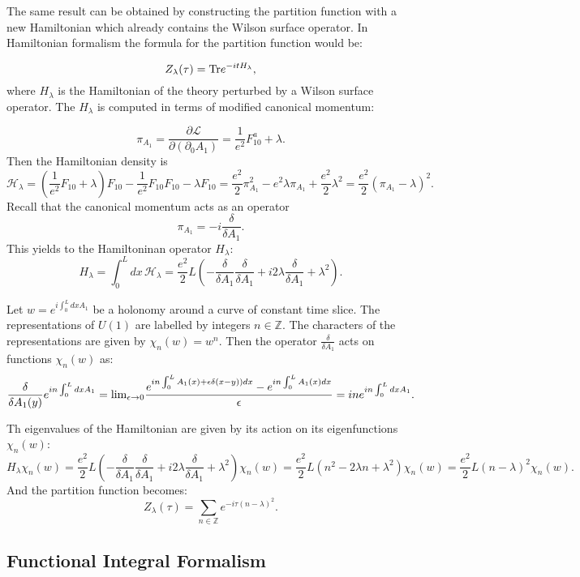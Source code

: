 \documentclass[11pt]{report}
\theoremstyle{plain}
\theoremstyle{definition}
\theoremstyle{remark}
\theoremstyle{remark}
\numberwithin{equation}{section}
\begin{document}
The same result can be obtained by constructing the partition function with a new Hamiltonian which already contains the Wilson surface operator. 
In Hamiltonian formalism the formula for the partition function would be:

 $$ 
Z_{\lambda}(\tau) = {\rm Tr} e^{-itH_{\lambda}},
$$
where $H_{\lambda}$ is the Hamiltonian of the theory perturbed by a Wilson surface operator. 
The $H_{\lambda}$ is computed in terms of modified canonical momentum:

$$
\pi_{A_1} = \frac{\partial \mathcal{L}}{\partial (\partial_0 A_1)} = \frac{1}{e^2}F^a_{10} + \lambda . 
$$
Then the Hamiltonian density is
%
$$
\mathcal{H_{\lambda}} = (\frac{1}{e^2}F_{10} + \lambda)F_{10} - \frac{1}{e^2}F_{10}F_{10} - \lambda F_{10} = \frac{e^2}{2}\pi_{A_1}^2 - e^2 \lambda \pi_{A_1} + \frac{e^2}{2} \lambda^2  = \frac{e^2}{2}(\pi_{A_1} - \lambda)^2.
$$
Recall that the canonical momentum acts as an operator 
%
$$
\pi_{A_1} = -i\frac{\delta}{\delta A_1}.
$$
This yields to the Hamiltoninan operator $H_{\lambda}$:
%
$$ H_{\lambda} = \int_0^L dx \, \mathcal{H_{\lambda}} = \frac{e^2}{2}L ( -\frac{\delta}{\delta A_1}\frac{\delta}{\delta A_1} +i 2\lambda \frac{\delta}{\delta A_1} + \lambda ^2).
$$

Let $w = e^{i\int_0^L dx A_1}$ be a holonomy around a curve of constant time slice. The representations of $U(1)$ are labelled by integers $n \in \mathbb{Z}$. The characters of the representations are given by $\chi_n(w) = w^n$. Then the operator $\frac{\delta}{\delta A_1}$ acts on functions $\chi_n(w)$ as:
%
$$
\frac{\delta}{\delta A_1(y)}e^{in\int_0^L dx A_1} = {\rm lim}_{\epsilon \to 0}\frac{ e^{in\int_0^L A_1(x) + \epsilon \delta(x-y))dx} -  e^{in\int_0^L A_1(x)dx}}{\epsilon}=in e^{in\int_0^L dx A_1}.
$$

Th eigenvalues of the Hamiltonian are given by its action on its eigenfunctions $\chi_n(w)$:
%
$$
H_{\lambda} \chi_n(w) = \frac{e^2}{2}L ( -\frac{\delta}{\delta A_1}\frac{\delta}{\delta A_1} +i 2\lambda \frac{\delta}{\delta A_1} + \lambda ^2) \chi_n(w)  = \frac{e^2}{2} L  (n^2 - 2\lambda n +\lambda ^2) \chi_n(w) = \frac{e^2}{2} L  (n-\lambda) ^2 \chi_n(w).
$$
And the partition function becomes:
%
$$
Z_{\lambda}(\tau) = \sum_{n \in \mathbb{Z}} e^{ -i\tau (n - \lambda )^2}.
$$			


 

\subsection{Functional Integral Formalism}
\end{document}
